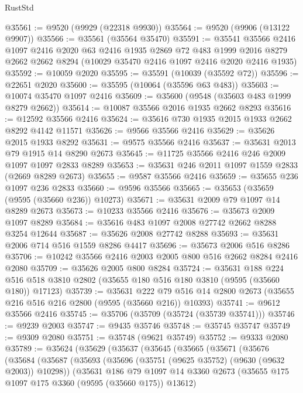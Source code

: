 \begin{lexlean}{RustStd}
\begin{coremodule}
@35561 := @9520 (@9929 (@22318 @9930))
@35564 := @9520 (@9906 (@13122 @9907))
@35566 := @35561 (@35564 @35470)
@35591 := @35541
    @35566
    @2416
    @1097
    @2416
    @2020
    @63
    @2416
    @1935
    @2869
    @72
    @483
    @1999
    @2016
    @8279
    @2662
    @2662
    @8294
    (@10029 @35470 @2416 @1097 @2416 @2020 @2416 @1935)
@35592 := @10059 @2020
@35595 := @35591 (@10039 (@35592 @72))
@35596 := @22651 @2020
@35600 := @35595 (@10064 (@35596 @63 @483))
@35603 := @10074 @35470 @1097 @2416
@35609 := @35600 (@9548 (@35603 @483 @1999 @8279 @2662))
@35614 := @10087 @35566 @2016 @1935 @2662 @8293
@35616 := @12592 @35566 @2416
@35624 := @35616 @730 @1935 @2015 @1933 @2662 @8292 @4142 @11571
@35626 := @9566 @35566 @2416
@35629 := @35626 @2015 @1933 @8292
@35631 := @9575 @35566 @2416
@35637 := @35631 @2013 @79 @1915 @14 @8290 @2673
@35645 := @11725 @35566 @2416 @246 @2009 @1097 @1097 @2833 @8289
@35653 := @35631 @246 @2011 @1097 @1559 @2833 (@2669 @8289 @2673)
@35655 := @9587 @35566 @2416
@35659 := @35655 @236 @1097 @236 @2833
@35660 := @9596 @35566
@35665 := @35653 (@35659 (@9595 (@35660 @236)) @10273)
@35671 := @35631 @2009 @79 @1097 @14 @8289 @2673
@35673 := @10233 @35566 @2416
@35676 := @35673 @2009 @1097 @8289
@35684 := @35616 @483 @1097 @2008 @27742 @2662 @8288 @3254 @12644
@35687 := @35626 @2008 @27742 @8288
@35693 := @35631 @2006 @714 @516 @1559 @8286 @4417
@35696 := @35673 @2006 @516 @8286
@35706 := @10242 @35566 @2416 @2003 @2005 @800 @516 @2662 @8284 @2416 @2080
@35709 := @35626 @2005 @800 @8284
@35724 := @35631
    @188
    @224
    @516
    @518
    @3810
    @2802
    (@35655 @180 @516 @180 @3810 (@9595 (@35660 @180)) @17123)
@35739 := @35631
    @222
    @79
    @516
    @14
    @2800
    @2673
    (@35655 @216 @516 @216 @2800 (@9595 (@35660 @216)) @10393)
@35741 := @9612 @35566 @2416
@35745 := @35706 (@35709 (@35724 (@35739 @35741)))
@35746 := @9239 @2003
@35747 := @9435 @35746
@35748 := @35745 @35747
@35749 := @9309 @2080
@35751 := @35748 (@9621 @35749)
@35752 := @9333 @2080
@35789 := @35624
    (@35629
      (@35637
        (@35645
          (@35665
            (@35671
              (@35676
                (@35684
                  (@35687
                    (@35693
                      (@35696 (@35751 (@9625 @35752) (@9630 (@9632 @2003)) @10298))
                      (@35631
                        @186
                        @79
                        @1097
                        @14
                        @3360
                        @2673
                        (@35655 @175 @1097 @175 @3360 (@9595 (@35660 @175)) @13612)

\end{coremodule}
\end{lexlean}
